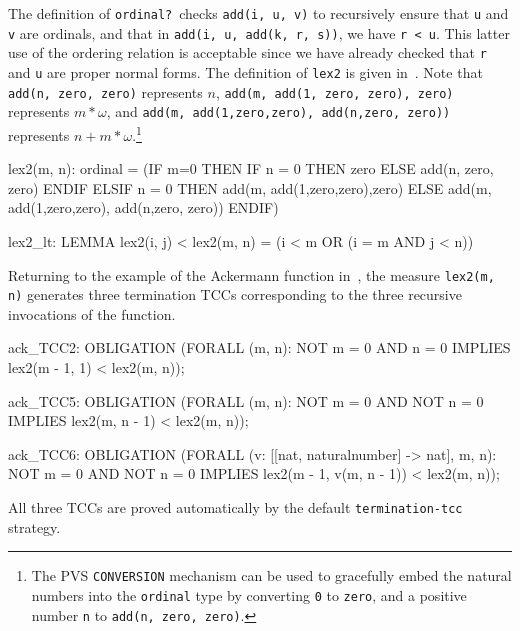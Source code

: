 \documentclass[11pt,twoside]{book}
\newcommand{\pvsref}[1]{\fbox{\footnotesize\ref{#1}}} \def\id#1{\hbox{\textt{#1}}} %
\begin{document}
The definition of \texttt{ordinal?}\ checks \texttt{add(i, u, v)} to
recursively ensure that \texttt{u} and \texttt{v} are ordinals, and that
in \texttt{add(i, u, add(k, r, s))}, we have \texttt{r < u}\@.  This latter
use of the ordering relation is acceptable since we have already
checked that \texttt{r} and \texttt{u} are proper normal forms.
The definition of \texttt{lex2} is given in~\pvsref{lex2}.  Note that
\texttt{add(n, zero, zero)} represents $n$,
\texttt{add(m, add(1, zero, zero), zero)} represents $m * \omega$,
and \texttt{add(m, add(1,zero,zero), add(n,zero, zero))} represents
$n + m * \omega$\@.\footnote{The PVS \texttt{CONVERSION} mechanism can be
used to gracefully embed the natural numbers into the \texttt{ordinal} type by
converting \texttt{0} to \texttt{zero}, and a positive number \texttt{n} to
\texttt{add(n, zero, zero)}\@.  }
\begin{session*}\label{lex2}
  lex2(m, n): ordinal = 
    (IF m=0
       THEN IF n = 0
               THEN zero
               ELSE add(n, zero, zero)
            ENDIF
       ELSIF n = 0 THEN add(m, add(1,zero,zero),zero)
       ELSE add(m, add(1,zero,zero), add(n,zero, zero))
     ENDIF)

  lex2_lt: LEMMA
    lex2(i, j) < lex2(m, n) =
     (i < m OR (i = m AND j < n))
\end{session*}

Returning to the example of the Ackermann function in~\pvsref{ackermann},
the measure \texttt{lex2(m, n)} generates three termination TCCs
corresponding to the three recursive invocations of the function.
\begin{session*}
ack_TCC2: OBLIGATION
      (FORALL (m, n): NOT m = 0 AND n = 0
        IMPLIES lex2(m - 1, 1) < lex2(m, n));

ack_TCC5: OBLIGATION
      (FORALL (m, n):
         NOT m = 0 AND NOT n = 0
          IMPLIES lex2(m, n - 1) < lex2(m, n));

ack_TCC6: OBLIGATION
      (FORALL (v: [[nat, naturalnumber] -> nat], m, n):
         NOT m = 0 AND NOT n = 0
             IMPLIES lex2(m - 1, v(m, n - 1)) < lex2(m, n));
\end{session*}
All three TCCs are proved automatically by the default \texttt{termination-tcc} strategy.   


\end{document}
